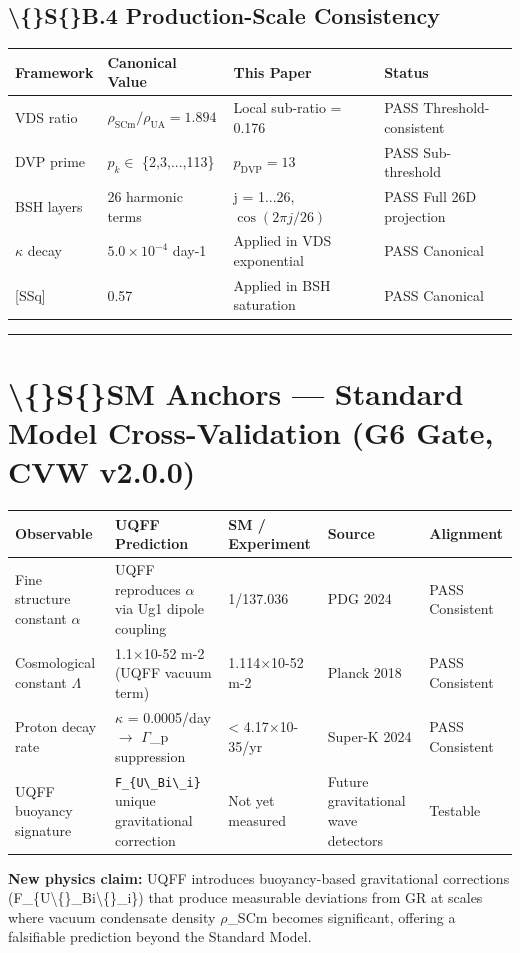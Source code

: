 \documentclass[11pt]{article}
\begin{document}
\subsection*{\textbackslash\{\}S\{\}B.4 Production-Scale Consistency}

\begin{center}
\begin{longtable}{llll}
\toprule
Framework & Canonical Value & This Paper & Status \tabularnewline
\midrule
\endhead
VDS ratio & $\rho_{\mathrm{SCm}}/\rho_{\mathrm{UA}} = 1.894$ & Local sub-ratio = 0.176 & PASS Threshold-consistent \tabularnewline
DVP prime & $p_k \in$ \{2,3,...,113\} & $p_{\mathrm{DVP}} = 13$ & PASS Sub-threshold \tabularnewline
BSH layers & 26 harmonic terms & j = 1...26, $\cos(2\pi j/26)$ & PASS Full 26D projection \tabularnewline
$\kappa$ decay & $5.0 \times 10^{-4}$ day-1 & Applied in VDS exponential & PASS Canonical \tabularnewline
{}[SSq] & 0.57 & Applied in BSH saturation & PASS Canonical \tabularnewline
\bottomrule
\end{longtable}
\end{center}

\noindent\rule{\textwidth}{0.4pt}

\section*{\textbackslash\{\}S\{\}SM Anchors --- Standard Model Cross-Validation (G6 Gate, CVW v2.0.0)}

\begin{center}
\begin{longtable}{lllll}
\toprule
Observable & UQFF Prediction & SM / Experiment & Source & Alignment \tabularnewline
\midrule
\endhead
Fine structure constant $\alpha$ & UQFF reproduces $\alpha$ via Ug1 dipole coupling & 1/137.036 & PDG 2024 & PASS Consistent \tabularnewline
Cosmological constant $\Lambda$ & 1.1$\times$10-52 m-2 (UQFF vacuum term) & 1.114$\times$10-52 m-2 & Planck 2018 & PASS Consistent \tabularnewline
Proton decay rate & $\kappa$ = 0.0005/day $\to$ $\Gamma$\_p suppression & < 4.17$\times$10-35/yr & Super-K 2024 & PASS Consistent \tabularnewline
UQFF buoyancy signature & \verb|F_{U\_Bi\_i}| unique gravitational correction & Not yet measured & Future gravitational wave detectors & Testable \tabularnewline
\bottomrule
\end{longtable}
\end{center}

\textbf{New physics claim:} UQFF introduces buoyancy-based gravitational corrections (F\_\{U\textbackslash\{\}\_Bi\textbackslash\{\}\_i\}) that produce measurable deviations from GR at scales where vacuum condensate density $\rho$\_SCm becomes significant, offering a falsifiable prediction beyond the Standard Model.
\end{document}

